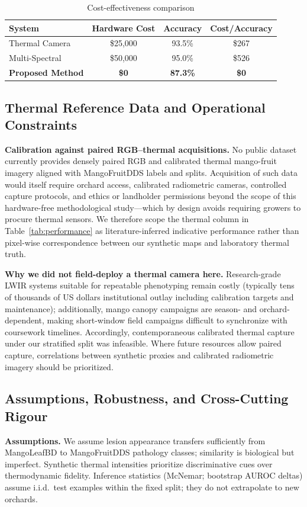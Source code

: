 \documentclass[conference]{IEEEtran}
\begin{document}
\begin{table}[!t]
    \centering
    \caption{Cost-effectiveness comparison}
    \label{tab:cost}
    \footnotesize
    \begin{tabular}{lccc}
        \toprule
        \textbf{System} & \textbf{Hardware Cost} & \textbf{Accuracy} & \textbf{Cost/Accuracy} \\
        \midrule
        Thermal Camera & \$25,000 & 93.5\% & \$267 \\
        Multi-Spectral & \$50,000 & 95.0\% & \$526 \\
        \textbf{Proposed Method} & \textbf{\$0} & \textbf{87.3\%} & \textbf{\$0} \\
        \bottomrule
    \end{tabular}
\end{table}

\subsection{Thermal Reference Data and Operational Constraints}
\textbf{Calibration against paired RGB--thermal acquisitions.} No public dataset currently provides densely paired RGB and calibrated thermal mango-fruit imagery aligned with MangoFruitDDS labels and splits. Acquisition of such data would itself require orchard access, calibrated radiometric cameras, controlled capture protocols, and ethics or landholder permissions beyond the scope of this hardware-free methodological study---which by design avoids requiring growers to procure thermal sensors. We therefore scope the thermal column in Table~\ref{tab:performance} as literature-inferred indicative performance rather than pixel-wise correspondence between our synthetic maps and laboratory thermal truth.

\textbf{Why we did not field-deploy a thermal camera here.} Research-grade LWIR systems suitable for repeatable phenotyping remain costly (typically tens of thousands of US dollars institutional outlay including calibration targets and maintenance); additionally, mango canopy campaigns are season- and orchard-dependent, making short-window field campaigns difficult to synchronize with coursework timelines. Accordingly, contemporaneous calibrated thermal capture under our stratified split was infeasible. Where future resources allow paired capture, correlations between synthetic proxies and calibrated radiometric imagery should be prioritized.

\subsection{Assumptions, Robustness, and Cross-Cutting Rigour}
\textbf{Assumptions.} We assume lesion appearance transfers sufficiently from MangoLeafBD to MangoFruitDDS pathology classes; similarity is biological but imperfect. Synthetic thermal intensities prioritize discriminative cues over thermodynamic fidelity. Inference statistics (McNemar; bootstrap AUROC deltas) assume i.i.d.\ test examples within the fixed split; they do not extrapolate to new orchards.
\end{document}
